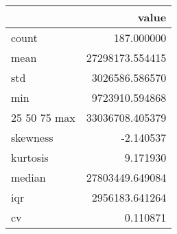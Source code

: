 \begin{tabular}{lr}
\toprule
 & value \\
\midrule
count & 187.000000 \\
mean & 27298173.554415 \\
std & 3026586.586570 \\
min & 9723910.594868 \\
25%
50%
75%
max & 33036708.405379 \\
skewness & -2.140537 \\
kurtosis & 9.171930 \\
median & 27803449.649084 \\
iqr & 2956183.641264 \\
cv & 0.110871 \\
\bottomrule
\end{tabular}
